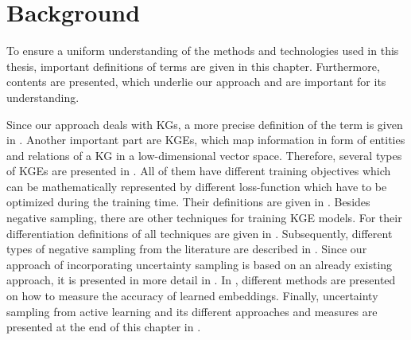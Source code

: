 \chapter{Background}
\label{ch:background}
%
To ensure a uniform understanding of the methods and technologies used in this thesis, important definitions of terms are given in this chapter.
Furthermore, contents are presented, which underlie our approach and are important for its understanding.

Since our approach deals with \acp{KG}, a more precise definition of the term is given in .
Another important part are \acp{KGE}, which map information in form of entities and relations of a \ac{KG} in a low-dimensional vector space.
Therefore, several types of \acp{KGE} are presented in .
All of them have different training objectives which can be mathematically represented by different loss-function which have to be optimized during the training time.
Their definitions are given in .
Besides negative sampling, there are other techniques for training \ac{KGE} models.
For their differentiation definitions of all techniques are given in . 
Subsequently, different types of negative sampling from the literature are described in .
Since our approach of incorporating uncertainty sampling is based on an already existing approach, it is presented in more detail in .
In , different methods are presented on how to measure the accuracy of learned embeddings.
Finally, uncertainty sampling from active learning and its different approaches and measures are presented at the end of this chapter in .
%

%

%

%

%

%
